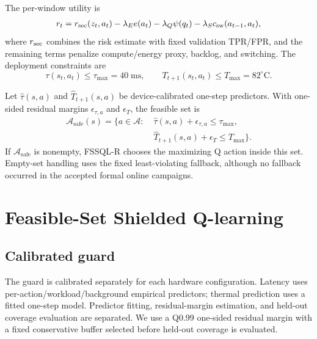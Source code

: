 \documentclass[journal]{IEEEtran}
\newcommand{\Aset}{\mathcal{A}}
\newcommand{\Asafe}{\mathcal{A}_{\mathrm{safe}}}
\begin{document}
The per-window utility is
\begin{equation}
\begin{split}
r_t = r_{\rm sec}(z_t,a_t)-\lambda_E e(a_t)
-\lambda_Q\psi(q_t)-\lambda_S c_{\rm sw}(a_{t-1},a_t),
\end{split}
\label{eq:reward}
\end{equation}
where $r_{\rm sec}$ combines the risk estimate with fixed validation TPR/FPR, and the remaining terms penalize compute/energy proxy, backlog, and switching. The deployment constraints are
\begin{equation}
\tau(s_t,a_t)\le \tau_{\max}=40\;\text{ms},\qquad
T_{t+1}(s_t,a_t)\le T_{\max}=82^\circ\text{C}.
\label{eq:caps}
\end{equation}

Let $\widehat{\tau}(s,a)$ and $\widehat{T}_{t+1}(s,a)$ be device-calibrated one-step predictors. With one-sided residual margins $\epsilon_{\tau,a}$ and $\epsilon_T$, the feasible set is
\begin{equation}
\begin{split}
\Asafe(s)=\{a\in\Aset:\;&\widehat{\tau}(s,a)+\epsilon_{\tau,a}\le\tau_{\max},\\
&\widehat{T}_{t+1}(s,a)+\epsilon_T\le T_{\max}\}.
\end{split}
\label{eq:safeset}
\end{equation}
If $\Asafe$ is nonempty, FSSQL-R chooses the maximizing Q action inside this set. Empty-set handling uses the fixed least-violating fallback, although no fallback occurred in the accepted formal online campaigns.

\section{Feasible-Set Shielded Q-learning}
\subsection{Calibrated guard}
The guard is calibrated separately for each hardware configuration. Latency uses per-action/workload/background empirical predictors; thermal prediction uses a fitted one-step model. Predictor fitting, residual-margin estimation, and held-out coverage evaluation are separated. We use a Q0.99 one-sided residual margin with a fixed conservative buffer selected before held-out coverage is evaluated.
\end{document}
